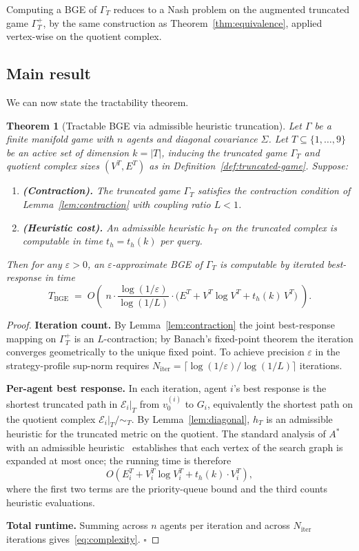 \documentclass[11pt]{article}
\newtheorem{theorem}{Theorem}[section]
\theoremstyle{definition}
\theoremstyle{remark}
\newcommand{\E}{\mathcal{E}}
\begin{document}
Computing a BGE of $\Gamma_T$ reduces to a Nash problem on the augmented truncated game
$\Gamma_T^+$, by the same construction as Theorem~\ref{thm:equivalence}, applied vertex-wise on the
quotient complex.

\subsection{Main result}

We can now state the tractability theorem.

\begin{theorem}[Tractable BGE via admissible heuristic truncation]
\label{thm:tractable-bge}
Let $\Gamma$ be a finite manifold game with $n$ agents and diagonal covariance $\Sigma$. Let
$T \subseteq \{1,\ldots,9\}$ be an active set of dimension $k = |T|$, inducing the truncated game
$\Gamma_T$ and quotient complex sizes $(V^T, E^T)$ as in Definition~\ref{def:truncated-game}.
Suppose:
\begin{enumerate}
\item \textbf{(Contraction).} The truncated game $\Gamma_T$ satisfies the contraction condition of
Lemma~\ref{lem:contraction} with coupling ratio $L < 1$.
\item \textbf{(Heuristic cost).} An admissible heuristic $h_T$ on the truncated complex is
computable in time $t_h = t_h(k)$ per query.
\end{enumerate}
Then for any $\varepsilon > 0$, an $\varepsilon$-approximate BGE of $\Gamma_T$ is computable by
iterated best-response in time
\begin{equation}
\label{eq:complexity}
T_{\mathrm{BGE}}
\;=\;
O\!\left(\; n \cdot \frac{\log(1/\varepsilon)}{\log(1/L)} \cdot \bigl(E^T + V^T \log V^T + t_h(k)\,V^T\bigr) \;\right).
\end{equation}
\end{theorem}

\begin{proof}
\textbf{Iteration count.} By Lemma~\ref{lem:contraction} the joint best-response mapping on
$\Gamma_T^+$ is an $L$-contraction; by Banach's fixed-point theorem the iteration converges
geometrically to the unique fixed point. To achieve precision $\varepsilon$ in the strategy-profile
sup-norm requires $N_{\mathrm{iter}} = \lceil \log(1/\varepsilon)/\log(1/L) \rceil$ iterations.

\textbf{Per-agent best response.} In each iteration, agent $i$'s best response is the shortest
truncated path in $\E_i|_T$ from $v_0^{(i)}$ to $G_i$, equivalently the shortest path on the quotient
complex $\E_i|_T/\sim_T$. By Lemma~\ref{lem:diagonal}, $h_T$ is an admissible heuristic for the
truncated metric on the quotient. The standard analysis of $A^*$ with an admissible
heuristic~\cite{hart1968} establishes that each vertex of the search graph is expanded at most once;
the running time is therefore
\[
O\!\left(E_i^T + V_i^T \log V_i^T + t_h(k)\cdot V_i^T\right),
\]
where the first two terms are the priority-queue bound and the third counts heuristic evaluations.

\textbf{Total runtime.} Summing across $n$ agents per iteration and across $N_{\mathrm{iter}}$
iterations gives~\eqref{eq:complexity}. $\square$
\end{proof}
\end{document}
